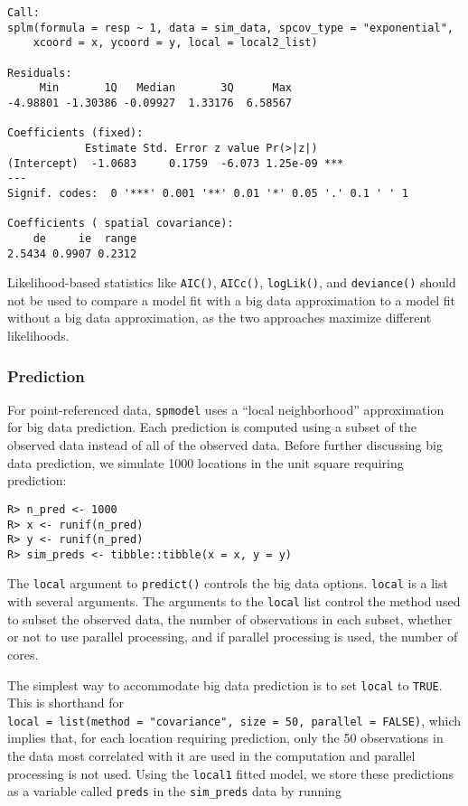 \documentclass[10pt,letterpaper]{article}
\begin{document}
\begin{verbatim}
Call:
splm(formula = resp ~ 1, data = sim_data, spcov_type = "exponential", 
    xcoord = x, ycoord = y, local = local2_list)

Residuals:
     Min       1Q   Median       3Q      Max 
-4.98801 -1.30386 -0.09927  1.33176  6.58567 

Coefficients (fixed):
            Estimate Std. Error z value Pr(>|z|)    
(Intercept)  -1.0683     0.1759  -6.073 1.25e-09 ***
---
Signif. codes:  0 '***' 0.001 '**' 0.01 '*' 0.05 '.' 0.1 ' ' 1

Coefficients ( spatial covariance):
    de     ie  range 
2.5434 0.9907 0.2312 
\end{verbatim}

Likelihood-based statistics like \texttt{AIC()}, \texttt{AICc()},
\texttt{logLik()}, and \texttt{deviance()} should not be used to compare
a model fit with a big data approximation to a model fit without a big
data approximation, as the two approaches maximize different
likelihoods.

\hypertarget{sec:predict}{%
\subsubsection{Prediction}\label{sec:predict}}

For point-referenced data, \texttt{spmodel} uses a ``local
neighborhood'' approximation for big data prediction. Each prediction is
computed using a subset of the observed data instead of all of the
observed data. Before further discussing big data prediction, we
simulate 1000 locations in the unit square requiring prediction:

\begin{verbatim}
R> n_pred <- 1000
R> x <- runif(n_pred)
R> y <- runif(n_pred)
R> sim_preds <- tibble::tibble(x = x, y = y)
\end{verbatim}

The \texttt{local} argument to \texttt{predict()} controls the big data
options. \texttt{local} is a list with several arguments. The arguments
to the \texttt{local} list control the method used to subset the
observed data, the number of observations in each subset, whether or not
to use parallel processing, and if parallel processing is used, the
number of cores.

The simplest way to accommodate big data prediction is to set
\texttt{local} to \texttt{TRUE}. This is shorthand for
\texttt{local\ =\ list(method\ =\ "covariance",\ size\ =\ 50,\ parallel\ =\ FALSE)},
which implies that, for each location requiring prediction, only the 50
observations in the data most correlated with it are used in the
computation and parallel processing is not used. Using the
\texttt{local1} fitted model, we store these predictions as a variable
called \texttt{preds} in the \texttt{sim\_preds} data by running
\end{document}
